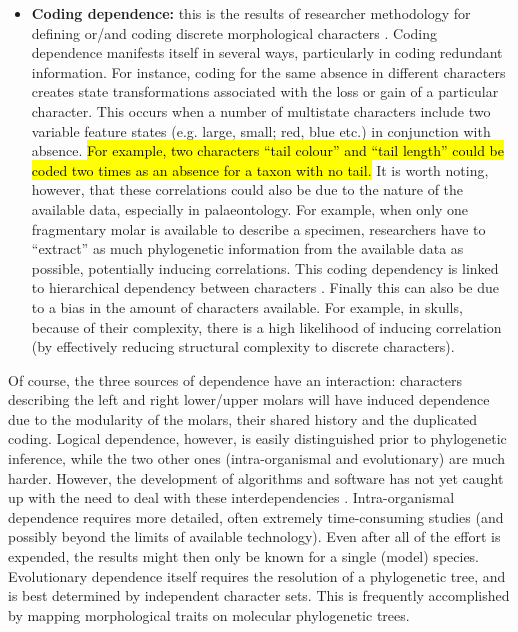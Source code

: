 \documentclass[12pt,letterpaper]{article}
\begin{document}
\begin{itemize}
    \item \textbf{Coding dependence:} this is the results of researcher methodology for defining or/and coding discrete morphological characters \citep{Brazeau2011,simoes2017giant}.
    Coding dependence manifests itself in several ways, particularly in coding redundant information.
    For instance, coding for the same absence in different characters creates state transformations associated with the loss or gain of a particular character.
    This occurs when a number of multistate characters include two variable feature states (e.g. large, small; red, blue etc.) in conjunction with absence.
    \hl{For example, two characters ``tail colour'' and ``tail length'' could be coded two times as an absence for a taxon with no tail.}
    It is worth noting, however, that these correlations could also be due to the nature of the available data, especially in palaeontology.
    For example, when only one fragmentary molar is available to describe a specimen, researchers have to ``extract'' as much phylogenetic information from the available data as possible, potentially inducing correlations.
    This coding dependency is linked to hierarchical dependency between characters \citep{wilkinson1995coping,BrazeauNA}.
    Finally this can also be due to a bias in the amount of characters available.
    For example, in skulls, because of their complexity, there is a high likelihood of inducing correlation (by effectively reducing structural complexity to discrete characters).
\end{itemize}

\noindent Of course, the three sources of dependence have an interaction: characters describing the left and right lower/upper molars will have induced dependence due to the modularity of the molars, their shared history and the duplicated coding.
Logical dependence, however, is easily distinguished prior to phylogenetic inference, while the two other ones (intra-organismal and evolutionary) are much harder.
However, the development of algorithms and software has not yet caught up with the need to deal with these interdependencies \citep{DeLaet2015,BrazeauNA}.
Intra-organismal dependence requires more detailed, often extremely time-consuming studies (and possibly beyond the limits of available technology).
Even after all of the effort is expended, the results might then only be known for a single (model) species.
Evolutionary dependence itself requires the resolution of a phylogenetic tree, and is best determined by independent character sets. 
This is frequently accomplished by mapping morphological traits on molecular phylogenetic trees.
\end{document}
